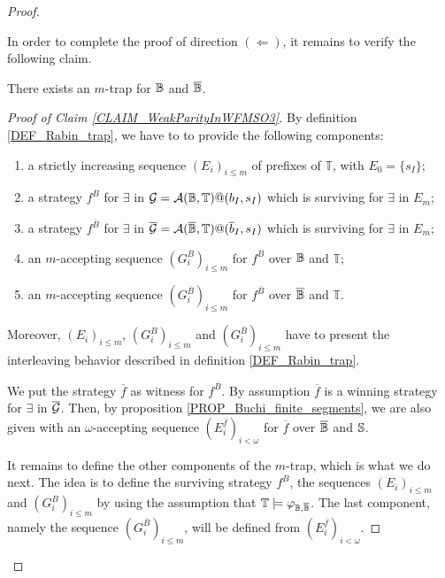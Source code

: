 \begin{proof}
\begin{Iff-LR}
In order to complete the proof of direction $(\Leftarrow)$, it remains to verify the following claim.

\smallskip

\begin{claim}\label{CLAIM_WeakParityInWFMSO3} There exists an $m$-trap for $\mathbb{B}$ and $\overline{\mathbb{B}}$.\end{claim}

\begin{proof}[Proof of Claim \ref{CLAIM_WeakParityInWFMSO3}] By definition \ref{DEF_Rabin_trap}, we have to to provide the following components:
\begin{enumerate}
  \item a strictly increasing sequence $(E_i)_{i\leq m}$ of prefixes of $\mathbb{T}$, with $E_0 = \{s_I\}$;
  \item a strategy $f^{B}$ for $\exists$ in $\mathcal{G}=\mathcal{A}(\mathbb{B},\mathbb{T})@(b_I,s_I)$ which is surviving for $\exists$ in $E_m$;
  \item a strategy $f^{\overline{B}}$ for $\exists$ in $\overline{\mathcal{G}}=\mathcal{A}(\overline{\mathbb{B}},\mathbb{T})@(\overline{b}_I,s_I)$ which is surviving for $\exists$ in $E_m$;
  \item an $m$-accepting sequence $(G_i^{B})_{i\leq m}$ for $f^{B}$ over $\mathbb{B}$ and $\mathbb{T}$;
  \item an $m$-accepting sequence $(G_i^{\overline{B}})_{i\leq m}$ for $f^{\overline{B}}$ over $\overline{\mathbb{B}}$ and $\mathbb{T}$.
\end{enumerate}
Moreover, $(E_i)_{i\leq m}$, $(G_i^{B})_{i\leq m}$ and $(G_i^{\overline{B}})_{i\leq m}$ have to present the interleaving behavior described in definition \ref{DEF_Rabin_trap}.

\smallskip

We put the strategy $\overline{f}$ as witness for $f^{\overline{B}}$. By assumption $\overline{f}$ is a winning strategy for $\exists$ in $\overline{\mathcal{G}}$. Then, by proposition \ref{PROP_Buchi_finite_segments}, we are also given with an $\omega$-accepting sequence $(E^{\overline{f}}_i)_{i< \omega}$ for $\overline{f}$ over $\overline{\mathbb{B}}$ and $\mathbb{S}$.

It remains to define the other components of the $m$-trap, which is what we do next. The idea is to define the surviving strategy $f^{B}$, the sequences $(E_i)_{i\leq m}$ and $(G_i^{B})_{i\leq m}$ by using the assumption that $\mathbb{T} \models \varphi_{\mathbb{B},\overline{\mathbb{B}}}$. The last component, namely the sequence $(G_i^{\overline{B}})_{i\leq m}$, will be defined from $(E^{\overline{f}}_i)_{i< \omega}$.


\end{proof}
\end{Iff-LR}
\end{proof}
